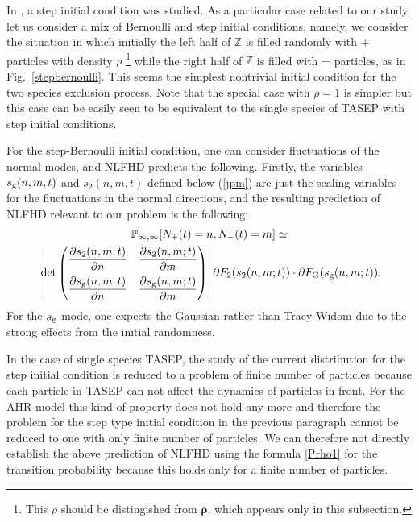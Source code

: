 \documentclass[cmp]{svjour}
\numberwithin{theorem}{section}
\numberwithin{equation}{section}
\def\Z{\mathbb{Z}}
\begin{document}
In \cite{mendl2016searching}, a step initial condition was studied. As a particular case related to our study, let us consider a mix of Bernoulli and step initial conditions, namely, we consider the situation in which initially the left half of $\Z$ is filled randomly with $+$ particles with density $\rho$ \footnote{This $\rho$ should be distingished from $\boldsymbol \rho$, which appears only in this subsection.} while the right half of $\Z$ is filled with $-$ particles, as in Fig.~\ref{stepbernoulli}. This seems the simplest nontrivial initial condition
for the two species exclusion process. Note that the special case with $\rho=1$ is simpler but this case can be easily seen to be equivalent to the single species of TASEP with step initial conditions.

For the step-Bernoulli initial condition, one can consider fluctuations of the normal modes, and NLFHD predicts the following. Firstly, the variables $s_{\rm g}(n,m,t)$ and $s_2(n,m,t)$ defined below (\ref{jpm})
are just the scaling variables
for the fluctuations in the normal directions, and the resulting prediction of NLFHD relevant to our problem is the following:
\begin{multline}
    \mathbb{P}_{\infty,\infty}[N_+(t)=n,N_-(t)=m]\simeq \\
	\left|\det
	\begin{pmatrix}
		\displaystyle \frac{\partial s_{2}(n,m;t)}{\partial n}		&\displaystyle\frac{\partial s_{2}(n,m;t)}{\partial m}\\[3mm]
		\displaystyle \frac{\partial s_{{\rm g}}(n,m;t)}{\partial n}		&\displaystyle \frac{\partial s_{{\rm g}}(n,m;t)}{\partial m}
	\end{pmatrix}
	\right|
	\partial F_2(s_{2}(n,m;t))\cdot \partial F_{\text G}(s_{{\rm g}}(n,m;t)).
	\label{infdistri}
\end{multline}
For the $s_{\rm g}$ mode, one expects the Gaussian rather than Tracy-Widom due to the strong effects from the initial randomness.

In the case of single species TASEP, the study of the current distribution for the step initial condition is reduced to a problem of finite number of particles because each particle in TASEP can not affect the dynamics of particles in front. For the AHR model this kind of property does not hold any more and therefore the problem for the step type initial condition in the previous paragraph cannot be reduced to one with only finite number of particles. We can therefore not directly establish the above prediction of NLFHD using the formula \eqref{Prho1} for the transition probability because this holds only for a finite number of particles.
\end{document}
